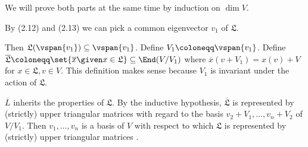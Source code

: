 We will prove both parts at the same time by induction on $\dim V$.

By (2.12) and (2.13) we can pick a common eigenvector $v_1$ of $\mathfrak{L}$.

Then  $\mathfrak{L}(\vspan{v_1}) \subseteq \vspan{v_1}$. Define
$V_1\coloneqq \vspan{v_1}$.
Define $\overline{\mathfrak{L}}\coloneqq \set{\overline{x}\given x \in \mathfrak{L}} \subseteq \End (V/V_1)$
where $\overline{x}(v + V_1) = x(v) + V$ for  $x \in \mathfrak{L}, v \in V$.
This definition makes sense because $V_1$ is invariant under the action of $\mathfrak{L}$.

$\overline{L}$ inherits the properties of $\mathfrak{L}$. By the inductive hypothesis,
$\overline{\mathfrak{L}}$ is represented by (strictly) upper triangular matrices
with regard to the basis $v_2 + V_1, \ldots, v_n + V_2$ of $V/V_1$. Then
$v_1, \ldots, v_n$ is a basis of $V$ with respect to which $\mathfrak{L}$ is represented
by (strictly) upper triangular matrices .
